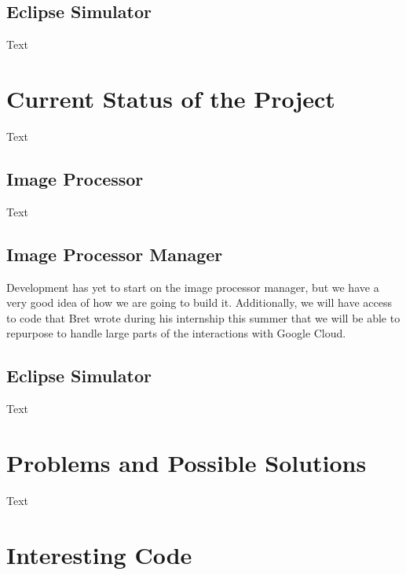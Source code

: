 \documentclass[10pt, onecolumn, draftclsnofoot, letterpaper, compsoc]{IEEEtran}
\begin{document}
\subsection{Eclipse Simulator}

Text


\section{Current Status of the Project}

Text

\subsection{Image Processor}

Text

\subsection{Image Processor Manager}

Development has yet to start on the image processor manager, but we have a very good idea of how we 
are going to build it. Additionally, we will have access to code that Bret wrote during his internship 
this summer that we will be able to repurpose to handle large parts of the interactions with Google Cloud.

\subsection{Eclipse Simulator}

Text

\section{Problems and Possible Solutions}

Text

\section{Interesting Code}
\end{document}
